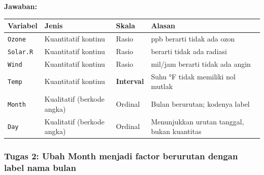 \documentclass[
  indonesian,
  letterpaper,
]{book}
\newcounter{none} %
\begin{document}
\textbf{Jawaban:}

{\def\LTcaptype{none} %
\begin{longtable}[]{@{}
  >{\raggedright\arraybackslash}p{}
  >{\raggedright\arraybackslash}p{}
  >{\raggedright\arraybackslash}p{}
  >{\raggedright\arraybackslash}p{}@{}}
\toprule\noalign{}
\begin{minipage}[b]{\linewidth}\raggedright
Variabel
\end{minipage} & \begin{minipage}[b]{\linewidth}\raggedright
Jenis
\end{minipage} & \begin{minipage}[b]{\linewidth}\raggedright
Skala
\end{minipage} & \begin{minipage}[b]{\linewidth}\raggedright
Alasan
\end{minipage} \\
\midrule\noalign{}
\endhead
\bottomrule\noalign{}
\endlastfoot
\texttt{Ozone} & Kuantitatif kontinu & Rasio & 0 ppb berarti tidak ada
ozon \\
\texttt{Solar.R} & Kuantitatif kontinu & Rasio & 0 berarti tidak ada
radiasi \\
\texttt{Wind} & Kuantitatif kontinu & Rasio & 0 mil/jam berarti tidak
ada angin \\
\texttt{Temp} & Kuantitatif kontinu & \textbf{Interval} & Suhu °F tidak
memiliki nol mutlak \\
\texttt{Month} & Kualitatif (berkode angka) & Ordinal & Bulan berurutan;
kodenya label \\
\texttt{Day} & Kualitatif (berkode angka) & Ordinal & Menunjukkan urutan
tanggal, bukan kuantitas \\
\end{longtable}
}

\subsubsection{Tugas 2: Ubah Month menjadi factor berurutan dengan label
nama
bulan}\label{tugas-2-ubah-month-menjadi-factor-berurutan-dengan-label-nama-bulan}
\end{document}
